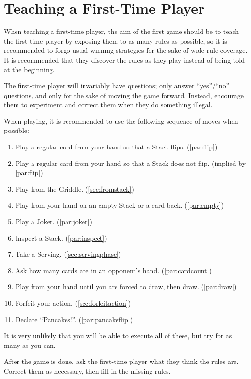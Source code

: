 \documentclass{article}
\begin{document}
\section{Teaching a First-Time Player \label{appendix:firsttime}}

When teaching a first-time player, the aim of the first game should be to teach the first-time player by exposing them to as many rules as possible, so it is recommended to forgo usual winning strategies for the sake of wide rule coverage. It is recommended that they discover the rules as they play instead of being told at the beginning.

The first-time player will invariably have questions; only answer ``yes''/``no'' questions, and only for the sake of moving the game forward. Instead, encourage them to experiment and correct them when they do something illegal.

When playing, it is recommended to use the following sequence of moves when possible:

\begin{enumerate}
  \item Play a regular card from your hand so that a Stack flips. (\autoref{par:flip})
  \item Play a regular card from your hand so that a Stack does not flip. (implied by \autoref{par:flip})
  \item Play from the Griddle. (\autoref{sec:fromstack})
  \item Play from your hand on an empty Stack or a card back. (\autoref{par:empty})
  \item Play a Joker. (\autoref{par:joker})
  \item Inspect a Stack. (\autoref{par:inspect})
  \item Take a Serving. (\autoref{sec:servingphase})
  \item Ask how many cards are in an opponent's hand. (\autoref{par:cardcount})
  \item Play from your hand until you are forced to draw, then draw. (\autoref{par:draw})
  \item Forfeit your action. (\autoref{sec:forfeitaction})
  \item Declare ``Pancakes!''. (\autoref{par:pancakeflip})
\end{enumerate}

It is very unlikely that you will be able to execute all of these, but try for as many as you can.

After the game is done, ask the first-time player what they think the rules are. Correct them as necessary, then fill in the missing rules.
\end{document}
